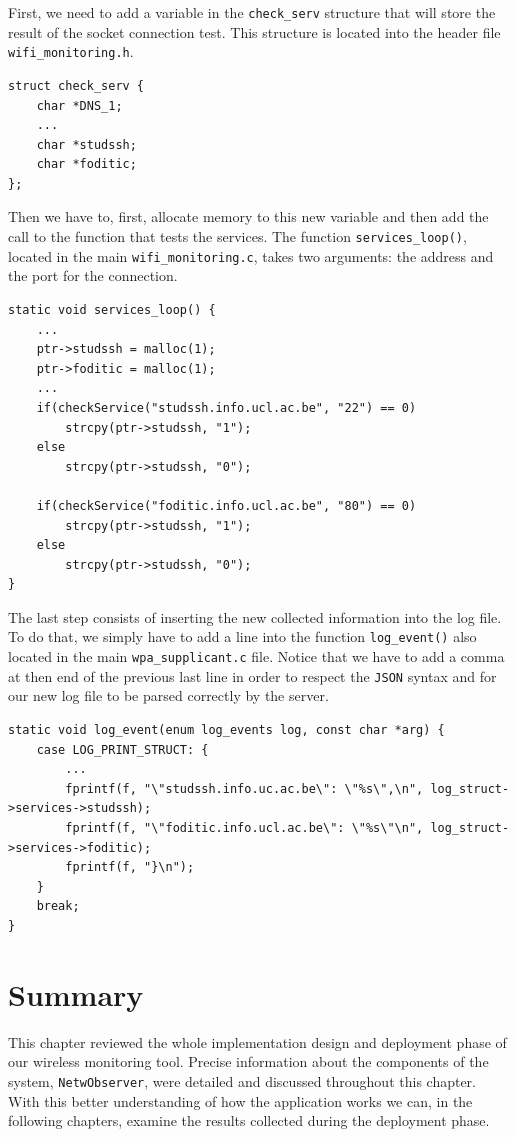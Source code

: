 First, we need to add a variable in the \texttt{check\_serv} structure that will store the result of the socket connection test. This structure is located into the header file \texttt{wifi\_monitoring.h}.\\

\begin{lstlisting}[frame=single,breaklines=true]
struct check_serv {
	char *DNS_1;
	...
	char *studssh;
	char *foditic;
};
\end{lstlisting}

Then we have to, first, allocate memory to this new variable and then add the call to the function that tests the services. The function \texttt{services\_loop()}, located in the main \texttt{wifi\_monitoring.c}, takes two arguments: the address and the port for the connection.\\

\begin{lstlisting}[frame=single,breaklines=true]
static void services_loop() {
	...
	ptr->studssh = malloc(1);
	ptr->foditic = malloc(1);
	...
	if(checkService("studssh.info.ucl.ac.be", "22") == 0)
		strcpy(ptr->studssh, "1");
	else
		strcpy(ptr->studssh, "0");

	if(checkService("foditic.info.ucl.ac.be", "80") == 0)
		strcpy(ptr->studssh, "1");
	else
		strcpy(ptr->studssh, "0");
}
\end{lstlisting}

The last step consists of inserting the new collected information into the log file. To do that, we simply have to add a line into the function \texttt{log\_event()} also located in the main \texttt{wpa\_supplicant.c} file. Notice that we have to add a comma at then end of the previous last line in order to respect the \texttt{JSON} syntax and for our new log file to be parsed correctly by the server.\\

\begin{lstlisting}[frame=single,breaklines=true]
static void log_event(enum log_events log, const char *arg) {
	case LOG_PRINT_STRUCT: {
		...
		fprintf(f, "\"studssh.info.uc.ac.be\": \"%s\",\n", log_struct->services->studssh);
		fprintf(f, "\"foditic.info.ucl.ac.be\": \"%s\"\n", log_struct->services->foditic);
		fprintf(f, "}\n");
	}
	break;
}
\end{lstlisting}


\section{Summary}
This chapter reviewed the whole implementation design and deployment phase of our wireless monitoring tool. Precise information about the components of the system, \texttt{NetwObserver}, were detailed and discussed throughout this chapter. With this better understanding of how the application works we can, in the following chapters, examine the results collected during the deployment phase. 